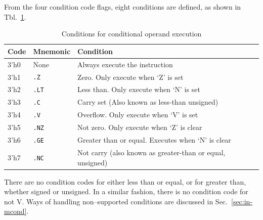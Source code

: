\documentclass{gqtekspec}
\begin{document}
From the four condition code flags, eight conditions are defined, as shown in
Tbl.~\ref{tbl:conditions}.
\begin{table}\begin{center}
\begin{tabular}{l|l|l}
Code & Mnemonic & Condition \\\hline
3'h0 & None & Always execute the instruction \\
3'h1 & {\tt .Z} & Zero.  Only execute when `Z' is set \\
3'h2 & {\tt .LT}& Less than.  Only execute when `N' is set \\
3'h3 & {\tt .C} & Carry set (Also known as less-than unsigned) \\
3'h4 & {\tt .V} & Overflow.  Only execute when `V' is set\\
3'h5 & {\tt .NZ}& Not zero.  Only execute when `Z' is clear \\
3'h6 & {\tt .GE}& Greater than or equal.  Executes when `N' is clear\\
3'h7 & {\tt .NC}& Not carry (also known as greater-than or equal, unsigned) \\
\end{tabular}
\caption{Conditions for conditional operand execution}\label{tbl:conditions}
\end{center}\end{table}
There are no condition codes for either less than or equal, or for greater
than, whether signed or unsigned.  In a similar fashion, there is no condition
code for not V.  Ways of handling non--supported conditions are discussed
in Sec.~\ref{sec:in-mcond}.
\end{document}
